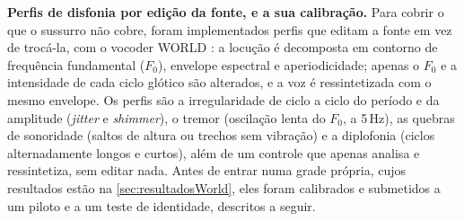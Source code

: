 				\par \textbf{Perfis de disfonia por edição da fonte, e a sua calibração.} Para cobrir o que o sussurro não cobre, foram implementados perfis que editam a fonte em vez de trocá-la, com o vocoder WORLD \cite{morise2016world}: a locução é decomposta em contorno de frequência fundamental ($F_0$), envelope espectral e aperiodicidade; apenas o $F_0$ e a intensidade de cada ciclo glótico são alterados, e a voz é ressintetizada com o mesmo envelope. Os perfis são a irregularidade de ciclo a ciclo do período e da amplitude (\textit{jitter} e \textit{shimmer}), o tremor (oscilação lenta do $F_0$, a 5\,Hz), as quebras de sonoridade (saltos de altura ou trechos sem vibração) e a diplofonia (ciclos alternadamente longos e curtos), além de um controle que apenas analisa e ressintetiza, sem editar nada. Antes de entrar numa grade própria, cujos resultados estão na \autoref{sec:resultadosWorld}, eles foram calibrados e submetidos a um piloto e a um teste de identidade, descritos a seguir.

